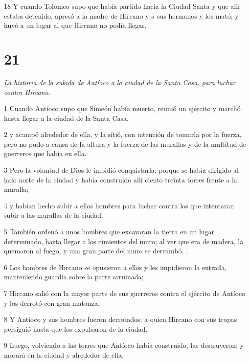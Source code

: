 \par 18 Y cuando Tolomeo supo que había partido hacia la Ciudad Santa y que allí estaba detenido, apresó a la madre de Hircano y a sus hermanos y los mató; y huyó a un lugar al que Hircano no podía llegar.



\chapter{21}

\par \textit{La historia de la subida de Antíoco a la ciudad de la Santa Casa, para luchar contra Hircano.}

\par 1 Cuando Antíoco supo que Simeón había muerto, reunió un ejército y marchó hasta llegar a la ciudad de la Santa Casa.

\par 2 y acampó alrededor de ella, y la sitió, con intención de tomarla por la fuerza, pero no pudo a causa de la altura y la fuerza de las murallas y de la multitud de guerreros que había en ella.

\par 3 Pero la voluntad de Dios le impidió conquistarla: porque se había dirigido al lado norte de la ciudad y había construido allí ciento treinta torres frente a la muralla;

\par 4 y habían hecho subir a ellos hombres para luchar contra los que intentaran subir a las murallas de la ciudad.

\par 5 También ordenó a unos hombres que excavaran la tierra en un lugar determinado, hasta llegar a los cimientos del muro; al ver que era de madera, la quemaron al fuego, y una gran parte del muro se derrumbó. .

\par 6 Los hombres de Hircano se opusieron a ellos y les impidieron la entrada, manteniendo guardia sobre la parte arruinada;

\par 7 Hircano salió con la mayor parte de sus guerreros contra el ejército de Antíoco y los derrotó con gran matanza.

\par 8 Y Antíoco y sus hombres fueron derrotados; a quien Hircano con sus tropas persiguió hasta que los expulsaron de la ciudad.

\par 9 Luego, volviendo a las torres que Antíoco había construido, las destruyeron; y morará en la ciudad y alrededor de ella.

